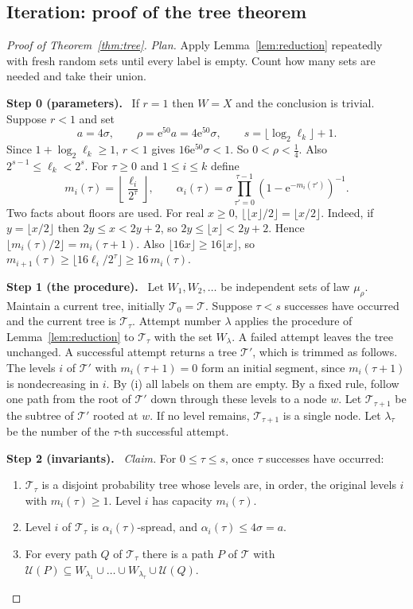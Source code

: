 \documentclass[11pt]{article}
\numberwithin{equation}{section}
\newcommand{\TT}{\mathcal T}
\newcommand{\UU}{\mathcal U}
\newcommand{\ee}{\mathrm e}
\newcommand{\step}[2]{\medskip\noindent\textbf{Step #1 (#2).}\ }
\begin{document}
\subsection{Iteration: proof of the tree theorem}\label{sec:iteration}

\begin{proof}[Proof of Theorem~\ref{thm:tree}]
\emph{Plan.} Apply Lemma~\ref{lem:reduction} repeatedly with fresh
random sets until every label is empty. Count how many sets are needed
and take their union.

\step{0}{parameters}
If $r=1$ then $W=X$ and the conclusion is trivial. Suppose $r<1$ and
set
\[
 a=4\sigma,\qquad \rho=\ee^{50}a=4\ee^{50}\sigma,
 \qquad s=\lfloor\log_2\ell_k\rfloor+1 .
\]
Since $1+\log_2\ell_k\ge1$, $r<1$ gives $16\ee^{50}\sigma<1$. So
$0<\rho<\frac14$. Also $2^{s-1}\le\ell_k<2^{s}$. For $\tau\ge0$ and
$1\le i\le k$ define
\begin{equation}\label{eq:capacities}
 m_i(\tau)=\left\lfloor\frac{\ell_i}{2^\tau}\right\rfloor,\qquad
 \alpha_i(\tau)=\sigma
 \prod_{\tau'=0}^{\tau-1}
 \left(1-\ee^{-m_i(\tau')}\right)^{-1}.
\end{equation}
Two facts about floors are used. For real $x\ge0$,
$\lfloor\lfloor x\rfloor/2\rfloor=\lfloor x/2\rfloor$. Indeed, if
$y=\lfloor x/2\rfloor$ then $2y\le x<2y+2$, so
$2y\le\lfloor x\rfloor<2y+2$. Hence
$\lfloor m_i(\tau)/2\rfloor=m_i(\tau+1)$. Also
$\lfloor16x\rfloor\ge16\lfloor x\rfloor$, so
$m_{i+1}(\tau)\ge\lfloor16\ell_i/2^\tau\rfloor\ge16\,m_i(\tau)$.

\step{1}{the procedure}
Let $W_1,W_2,\dots$ be independent sets of law $\mu_\rho$. Maintain a
current tree, initially $\TT_0=\TT$. Suppose $\tau<s$ successes have
occurred and the current tree is $\TT_\tau$. Attempt number $\lambda$
applies the procedure of Lemma~\ref{lem:reduction} to $\TT_\tau$ with
the set $W_\lambda$. A failed attempt leaves the tree unchanged. A
successful attempt returns a tree $\TT'$, which is trimmed as follows.
The levels $i$ of $\TT'$ with $m_i(\tau+1)=0$ form an initial segment,
since $m_i(\tau+1)$ is nondecreasing in $i$. By (i) all labels on them
are empty. By a fixed rule, follow one path from the root of $\TT'$
down through these levels to a node $w$. Let $\TT_{\tau+1}$ be the
subtree of $\TT'$ rooted at $w$. If no level remains, $\TT_{\tau+1}$
is a single node. Let $\lambda_\tau$ be the number of the $\tau$-th
successful attempt.

\step{2}{invariants}
\emph{Claim.} For $0\le\tau\le s$, once $\tau$ successes have
occurred:
\begin{enumerate}[label=(I\arabic*),leftmargin=2.8em,itemsep=2pt]
 \item $\TT_\tau$ is a disjoint probability tree whose levels are, in
 order, the original levels $i$ with $m_i(\tau)\ge1$. Level $i$ has
 capacity $m_i(\tau)$.
 \item Level $i$ of $\TT_\tau$ is $\alpha_i(\tau)$-spread, and
 $\alpha_i(\tau)\le4\sigma=a$.
 \item For every path $Q$ of $\TT_\tau$ there is a path $P$ of $\TT$
 with
 $\UU(P)\subseteq W_{\lambda_1}\cup\dots\cup W_{\lambda_\tau}\cup\UU(Q)$.
\end{enumerate}


\end{proof}
\end{document}
